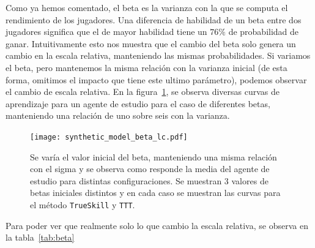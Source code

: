 \documentclass[11pt,twoside, spanish]{report} %
\begin{document}
Como ya hemos comentado, el beta es la varianza con la que se computa el rendimiento de los jugadores.
Una diferencia de habilidad de un beta entre dos jugadores significa que el de mayor habilidad tiene un $76\%$ de probabilidad de ganar.
Intuitivamente esto nos muestra que el cambio del beta solo genera un cambio en la escala relativa, manteniendo las mismas probabilidades.
Si variamos el beta, pero mantenemos la misma relaci\'on con la varianza inicial (de esta forma, omitimos el impacto que tiene este ultimo par\'ametro), podemos observar el cambio de escala relativa.
En la figura~\ref{fig:beta_lc}, se observa diversas curvas de aprendizaje para un agente de estudio para el caso de diferentes betas, manteniendo una relaci\'on de uno sobre seis con la varianza.


\begin{figure}[H]
	\centering
	\texttt{[image: synthetic\_model\_beta\_lc.pdf]}
	\caption{Se var\'ia el valor inicial del beta, manteniendo una misma relaci\'on con el sigma y se observa como responde la media del agente de estudio para distintas configuraciones. Se muestran 3 valores de betas iniciales distintos y en cada caso se muestran las curvas para el m\'etodo \texttt{TrueSkill} y \texttt{TTT}.}
	\label{fig:beta_lc}
\end{figure}




Para poder ver que realmente solo lo que cambio la escala relativa, se observa en la tabla~\ref{tab:beta}
\end{document}
